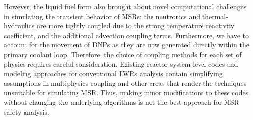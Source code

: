 However, the liquid fuel form also brought about novel computational
challenges in simulating the transient behavior of \glspl{MSR}; the
neutronics and thermal-hydraulics are more tightly coupled due to the strong
temperature reactivity coefficient, and the additional advection coupling
terms. Furthermore, we have to account for the movement of \glspl{DNP} as
they are now generated directly within the primary coolant loop. Therefore,
the choice of coupling methods for each set of physics requires careful
consideration. Existing reactor system-level codes and modeling approaches
for conventional \glspl{LWR} analysis contain simplifying assumptions in
multiphysics coupling and other areas that render the techniques unsuitable
for simulating \gls{MSR}. Thus, making minor modifications to these codes
without changing the underlying algorithms is not the best approach for
\gls{MSR} safety analysis.

